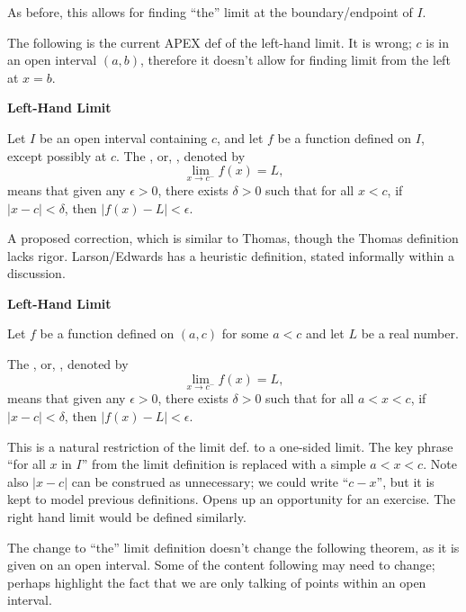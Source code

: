 \documentclass{article}
\begin{document}
As before, this allows for finding ``the'' limit at the boundary/endpoint of $I$.

The following is the current APEX def of the left-hand limit. It is wrong; $c$ is in an open interval $(a,b)$, therefore it doesn't allow for finding limit from the left at $x=b$. 

{\textbf{Left-Hand Limit} 

\indent Let $I$ be an open interval containing $c$, and let $f$ be a function defined on $I$, except possibly at $c$. 
The , or, , denoted by  
$$\displaystyle \lim_{x\rightarrow c^-} f(x) = L,$$
means that given any $\epsilon > 0$, there exists $\delta > 0$ such that for all $x< c$,  
if  $|x - c| < \delta$, then $|f(x) - L| < \epsilon$.
}

A proposed correction, which is similar to Thomas, though the Thomas definition lacks rigor. Larson/Edwards has a heuristic definition, stated informally within a discussion.

{\textbf{Left-Hand Limit} 

\indent Let $f$ be a function defined on $(a,c)$ for some $a<c$ and let $L$ be a real number. 

The , or, , denoted by  
$$\displaystyle \lim_{x\rightarrow c^-} f(x) = L,$$
means that given any $\epsilon > 0$, there exists $\delta > 0$ such that for all $a<x<c$,  
if  $|x - c| < \delta$, then $|f(x) - L| < \epsilon$.
}

This is a natural restriction of the limit def. to a one-sided limit. The key phrase ``for all $x$ in $I$'' from the limit definition is replaced with a simple $a<x<c$. Note also $|x-c|$ can be construed as unnecessary; we could write ``$c-x$'', but it is kept to model previous definitions. Opens up an opportunity for an exercise. The right hand limit would be defined similarly.

The change to ``the'' limit definition doesn't change the following theorem, as it is given on an open interval. Some of the content following may need to change; perhaps highlight the fact that we are only talking of points within an open interval.
\end{document}
